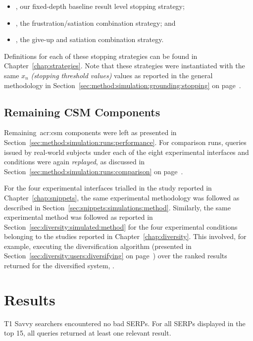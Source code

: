 \begin{itemize}
    \item{, our fixed-depth baseline result level stopping strategy;}
    \item{, the frustration/satiation combination strategy; and}
    \item{, the give-up and satiation combination strategy.}
\end{itemize}

Definitions for each of these stopping strategies can be found in Chapter~\ref{chap:strategies}. Note that these strategies were instantiated with the same $x_n$ \emph{(stopping threshold values)} values as reported in the general methodology in Section~\ref{sec:method:simulation:grounding:stopping} on page~\pageref{sec:method:simulation:grounding:stopping}.

\subsection{Remaining CSM Components}\label{sec:serp:method:other}
Remaining~\gls{acr:csm} components were left as presented in Section~\ref{sec:method:simulation:runs:performance}. For comparison runs, queries issued by real-world subjects under each of the eight experimental interfaces and conditions were again \emph{replayed}, as discussed in Section~\ref{sec:method:simulation:runs:comparison} on page~\pageref{sec:method:simulation:runs:comparison}.

For the four experimental interfaces trialled in the study reported in Chapter~\ref{chap:snippets}, the same experimental methodology was followed as described in Section~\ref{sec:snippets:simulations:method}. Similarly, the same experimental method was followed as reported in Section~\ref{sec:diversity:simulated:method} for the four experimental conditions belonging to the studies reported in Chapter~\ref{chap:diversity}. This involved, for example, executing the diversification algorithm (presented in Section~\ref{sec:diversity:users:diversifying} on page~\pageref{sec:diversity:users:diversifying}) over the ranked results returned for the diversified system, .

\section{Results}

T1 Savvy searchers encountered no bad SERPs. For all SERPs displayed in the top 15, all queries returned at least one relevant result.

